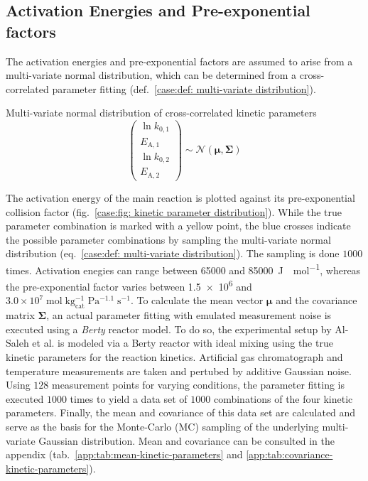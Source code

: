 \subsection{Activation Energies and Pre-exponential factors}
The activation energies and pre-exponential factors are assumed to arise from a multi-variate normal distribution, which
can be determined from a cross-correlated parameter fitting (def.~\ref{case:def: multi-variate distribution}).
\begin{definition} Multi-variate normal distribution of cross-correlated kinetic parameters
    \label{case:def: multi-variate distribution}
    \[
        \begin{pmatrix}
            \ln k_{0,1} \\ E_{\text{A}, 1} \\ \ln k_{0,2} \\ E_{\text{A}, 2} 
        \end{pmatrix} \sim \mathcal{N}(\bm{\mu}, \bm{\Sigma})
    \]
\end{definition}
\noindent
The activation energy of the main reaction is plotted against its pre-exponential collision factor (fig.~\ref{case:fig: kinetic parameter distribution}).
While the true parameter combination is marked with a yellow point, the blue crosses indicate
the possible parameter combinations by sampling the multi-variate normal distribution (eq.~\ref{case:def: multi-variate distribution}).
The sampling is done $1000$ times. Activation enegies can range between \SI{65000}{} and \SI{85000}{\joule \; \mole^{-1}},
whereas the pre-exponential factor varies between \SI{1.5e6}{} and $3.0 \times 10^7 \; \mathrm{mol \; kg_{cat}^{-1} \; Pa^{-1.1} \; s^{-1}}$.
To calculate the mean vector $\bm{\mu}$ and the covariance matrix $\bm{\Sigma}$, an actual parameter fitting with emulated
measurement noise is executed using a \emph{Berty} reactor model.
To do so, the experimental setup by Al-Saleh et al. \cite{alsaleh1988} is modeled via a Berty reactor with ideal mixing
using the true kinetic parameters for the reaction kinetics.
Artificial gas chromatograph and temperature measurements are taken and pertubed by additive Gaussian noise.
Using $128$ measurement points for varying conditions, the parameter fitting is executed $1000$ times
to yield a data set of $1000$ combinations of the four kinetic parameters.
Finally, the mean and covariance of this data set are calculated and serve as the basis for the
Monte-Carlo (MC) sampling of the underlying multi-variate Gaussian distribution. 
Mean and covariance can be consulted in the appendix 
(tab.~\ref{app:tab:mean-kinetic-parameters} and \ref{app:tab:covariance-kinetic-parameters}).

